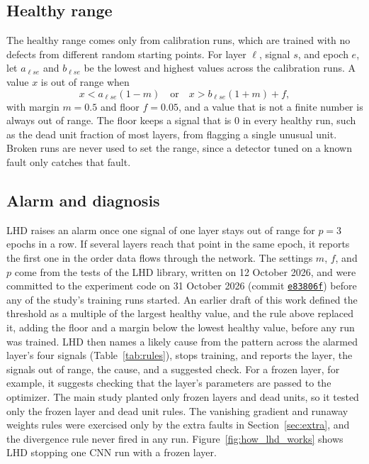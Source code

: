 \documentclass[11pt]{article}
\begin{document}
\subsection{Healthy range}

The healthy range comes only from calibration runs, which are trained with no defects from different random starting points. For layer $\ell$, signal $s$, and epoch $e$, let $a_{\ell s e}$ and $b_{\ell s e}$ be the lowest and highest values across the calibration runs. A value $x$ is out of range when
\begin{equation}
x < a_{\ell s e}(1 - m) \quad \text{or} \quad x > b_{\ell s e}(1 + m) + f,
\end{equation}
with margin $m = 0.5$ and floor $f = 0.05$, and a value that is not a finite number is always out of range. The floor keeps a signal that is 0 in every healthy run, such as the dead unit fraction of most layers, from flagging a single unusual unit. Broken runs are never used to set the range, since a detector tuned on a known fault only catches that fault.

\subsection{Alarm and diagnosis}

LHD raises an alarm once one signal of one layer stays out of range for $p = 3$ epochs in a row. If several layers reach that point in the same epoch, it reports the first one in the order data flows through the network. The settings $m$, $f$, and $p$ come from the tests of the LHD library, written on 12 October 2026, and were committed to the experiment code on 31 October 2026 (commit \href{https://github.com/sohan-bhat/lhd/commit/e83806f}{\texttt{e83806f}}) before any of the study's training runs started. An earlier draft of this work defined the threshold as a multiple of the largest healthy value, and the rule above replaced it, adding the floor and a margin below the lowest healthy value, before any run was trained. LHD then names a likely cause from the pattern across the alarmed layer's four signals (Table~\ref{tab:rules}), stops training, and reports the layer, the signals out of range, the cause, and a suggested check. For a frozen layer, for example, it suggests checking that the layer's parameters are passed to the optimizer. The main study planted only frozen layers and dead units, so it tested only the frozen layer and dead unit rules. The vanishing gradient and runaway weights rules were exercised only by the extra faults in Section~\ref{sec:extra}, and the divergence rule never fired in any run. Figure~\ref{fig:how_lhd_works} shows LHD stopping one CNN run with a frozen layer.
\end{document}

